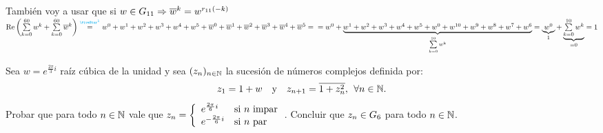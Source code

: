 \documentclass[12pt,a4paper, spanish]{article}
\begin{document}
\begin{enumerate}[label=\roman*)]
	      También voy a usar que si $w \en G_{11} \entonces \conj w^k = w^{r_{11}(-k)}$\\
	      $\re\parentesis{\sumatoria{k=0}{60}w^k +\sumatoria{k=0}{60}\conj w^k } \stackrel{\llamada1}=
		      w^0 + w^1 + w^2 + w^3 + w^4 + w^5 + \conj w^0 + \conj w^1 + \conj w^2 + \conj w^3 + \conj w^4 + \conj w^5 =\\
		      = w^0 + \ub{w^1 + w^2 + w^3 + w^4 + w^5 + w^0 + w^{10} + w^9 + w^8 + w^7 + w^6}{\sumatoria{k=0}{10} w^k} =
		      \ub{w^0}{1} + \ub{\sumatoria{k=0}{10} w^k}{= 0} = 1
	      $
\end{enumerate}

\ejercicio
Sea $w = e^{\frac{2\pi}{3}i}$ raíz cúbica de la unidad y sea $(z_n)_{n\en \naturales}$ la sucesión de números
complejos definida por:
\[
	z_1 = 1+w \quad \text{y} \quad z_{n+1} = \conj{1 + z_n^2},\, \paratodo n \en \naturales.
\]
Probar que para todo $n \en \naturales$ vale que
$z_n =
	\llave{ll}{
		e^{\frac{2\pi}{6}i}  & \text{si $n$ impar}\\
		e^{-\frac{2\pi}{6}i}  & \text{si $n$ par}
	}$. Concluir que $z_n \en G_6$ para todo $n \en \naturales$.
\end{document}
